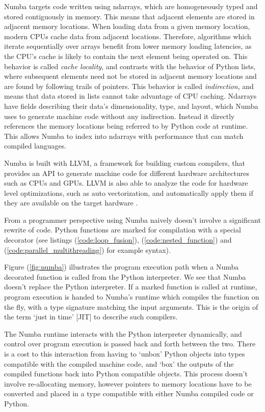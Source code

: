 \documentclass{IEEEcsmag}
\begin{document}
Numba targets code written using ndarrays, which are homogeneously typed and stored contiguously in memory. This means that adjacent elements are stored in adjacent memory locations. When loading data from a given memory location, modern CPUs cache data from adjacent locations. Therefore, algorithms which iterate sequentially over arrays benefit from lower memory loading latencies, as the CPU's cache is likely to contain the next element being operated on. This behavior is called \textit{cache locality}, and contrasts with the behavior of Python lists, where subsequent elements need not be stored in adjacent memory locations and are found by following trails of pointers. This behavior is called \textit{indirection}, and means that data stored in lists cannot take advantage of CPU caching. Ndarrays have fields describing their data's dimensionality, type, and layout, which Numba uses to generate machine code without any indirection. Instead it directly references the memory locations being referred to by Python code at runtime. This allows Numba to index into ndarrays with performance that can match compiled languages.

Numba is built with LLVM, a framework for building custom compilers, that provides an API to generate machine code for different hardware architectures such as CPUs and GPUs. LLVM is also able to analyze the code for hardware level optimizations, such as auto vectorization, and automatically apply them if they are available on the target hardware \cite{Lattner2004}.

From a programmer perspective using Numba naively doesn't involve a significant rewrite of code. Python functions are marked for compilation with a special decorator (see listings (\ref{code:loop_fusion}), (\ref{code:nested_function}) and (\ref{code:parallel_multithreading}) for example syntax).

Figure (\ref{fig:numba}) illustrates the program execution path when a Numba decorated function is called from the Python interpreter. We see that Numba doesn't replace the Python interpreter. If a marked function is called at runtime, program execution is handed to Numba's runtime which compiles the function on the fly, with a type signature matching the input arguments. This is the origin of the term `just in time' [JIT] to describe such compilers.

The Numba runtime interacts with the Python interpreter dynamically, and control over program execution is passed back and forth between the two. There is a cost to this interaction from having to `unbox' Python objects into types compatible with the compiled machine code, and `box' the outputs of the compiled functions back into Python compatible objects. This process doesn't involve re-allocating memory, however pointers to memory locations have to be converted and placed in a type compatible with either Numba compiled code or Python.
\end{document}
